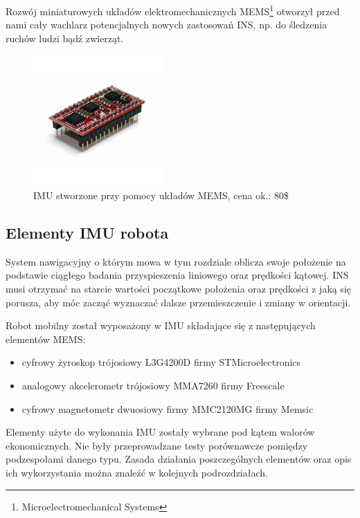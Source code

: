 Rozwój miniaturowych układów elektromechanicznych MEMS\footnote{Microelectromechanical Systems} otworzył przed nami cały
wachlarz potencjalnych nowych zastosowań INS, np. do śledzenia ruchów ludzi bądź
zwierząt.

\begin{figure}[!ht]
 \centering
 \includegraphics[height=50mm]{../images/ch04/mems_imu.jpg}
 \caption[IMU stworzone przy pomocy układów MEMS]{IMU stworzone przy pomocy układów MEMS, cena ok.: 80\$\footnotemark}
 \label{fig:IMUMEMS}
\end{figure}

\subsection{Elementy IMU robota}
System nawigacyjny o którym mowa w tym rozdziale oblicza swoje położenie na
podstawie ciągłego badania przyspieszenia liniowego oraz prędkości kątowej. INS
musi otrzymać na starcie wartości początkowe położenia oraz prędkości z jaką się
porusza, aby móc zacząć wyznaczać dalsze przemieszczenie i zmiany w orientacji.

Robot mobilny został wyposażony w IMU składające się z następujących elementów MEMS:
\begin{itemize}
  \item cyfrowy żyroskop trójosiowy L3G4200D firmy STMicroelectronics
  \item analogowy akcelerometr trójosiowy MMA7260 firmy Freescale
  \item cyfrowy magnetometr dwuosiowy firmy MMC2120MG firmy Memsic
\end{itemize}
Elementy użyte do wykonania IMU zostały wybrane pod kątem walorów ekonomicznych. 
Nie były przeprowadzane testy porównawcze pomiędzy podzespołami danego typu.
Zasada działania poszczególnych elementów oraz opis ich wykorzystania można znaleźć w kolejnych podrozdziałach.
